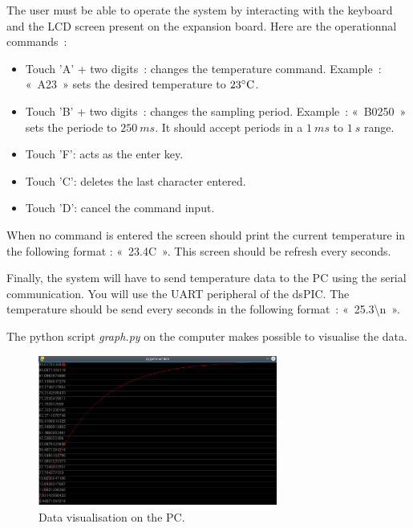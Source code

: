 \documentclass[11pt,a4paper]{article}
\theoremstyle{definition}%
\begin{document}
The user must be able to operate the system by interacting with the keyboard and the LCD screen present on the expansion board.
Here are the operationnal commands~:
\begin{itemize}
	\item Touch 'A' + two digits~: changes the temperature command.
	Example~: «~A23~» sets the desired temperature to $23\celsius$.
	\item Touch 'B' + two digits~: changes the sampling period.
	Example~: «~B0250~» sets the periode to $250\ ms$.
	It should accept periods in a $1\ ms$ to $1\ s$ range.
	\item Touch 'F': acts as the enter key. 
	\item Touch 'C': deletes the last character entered.
	\item Touch 'D': cancel the command input.
\end{itemize}

When no command is entered the screen should print the current temperature in the following format : «~23.4C~».
This screen should be refresh every seconds.

Finally, the system will have to send temperature data to the PC using the serial communication.
You will use the UART peripheral of the dsPIC.
The temperature should be send every seconds in the following format~: «~25.3\textbackslash n~».

The python script \textit{graph.py} on the computer makes possible to visualise the data.
\begin{figure}[H]
\center
\includegraphics[width=0.7\textwidth]{graph}
\caption{Data visualisation on the PC.}
\label{fig:graphpy}
\end{figure}





\end{document}
